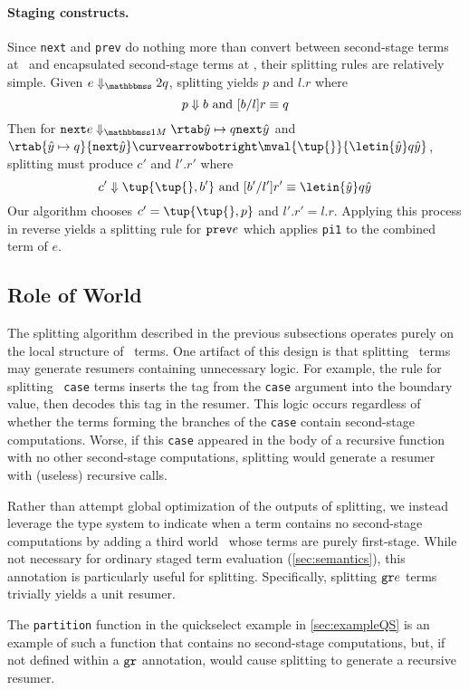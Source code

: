 \begin{abstrsyn}
\paragraph{Staging constructs.}
Since \texttt{next} and \texttt{prev} do nothing more than convert between 
second-stage terms at \bbtwo\ and encapsulated second-stage terms at \bbonem,
their splitting rules are relatively simple.
Given $\diatwo e q$, splitting yields $p$ and $l.r$ where
\[
	{p} \Downarrow {b} \text{ and } [b/l]r \equiv q
\]
Then for $\diaone {\next {e}} {{\hat y} \mapsto q} {\next {\hat y}}$
and\\ $\rtab {{\hat y} \mapsto q} {\next {\hat y}} \vsplito \mval {\tup{}} {\letin {\hat y} q {\hat y}}$, splitting must produce $c'$ and $l'.r'$ where
\[
	\reduce {c'} {\tup {\tup{},b'}} \text{ and } [b'/l']r' \equiv \letin {\hat y} q {\hat y}
\]
Our algorithm chooses $c' = \tup{\tup{},p}$ and $l'.r' = l.r$.
Applying this process in reverse yields a splitting rule for ${\tt prev} e$ which applies \texttt{pi1} to the combined term of $e$.

\subsection {Role of World \bbonep}
\label{sec:needGround}

The splitting algorithm described in the previous subsections operates
purely on the local structure of \lang\ terms.  One artifact of this design
is that splitting \bbonem\ terms may generate resumers containing
unnecessary logic.  For example, the rule for splitting
\bbonem\ \texttt{case} terms inserts the tag from the \texttt{case}
argument into the boundary value, then decodes this tag in the
resumer. This logic occurs regardless of whether the terms forming the
branches of the \texttt{case} contain second-stage computations.
Worse, if this \texttt{case} appeared in the body of a recursive
function with no other second-stage computations, splitting would
generate a resumer with (useless) recursive calls.

Rather than attempt global optimization of the outputs of splitting,
we instead leverage the type system to indicate when a term contains
no second-stage computations by adding a third world \bbonep\ whose
terms are purely first-stage.  While not necessary for ordinary staged
term evaluation (\ref{sec:semantics}), this annotation is
particularly useful for splitting. Specifically, splitting ${\tt gr} e$
terms trivially yields a unit resumer.

The \texttt{partition} function in the quickselect example in
\ref{sec:exampleQS} is an example of such a function that contains no
second-stage computations, but, if not defined within a ${\tt gr}$
annotation, would cause splitting to generate a recursive resumer.

\end{abstrsyn}



